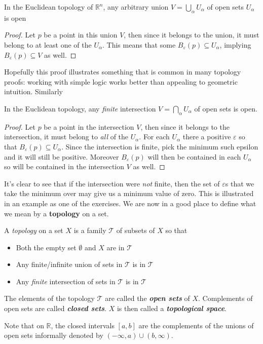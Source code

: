 	\begin{prop}
		In the Euclidean topology of $\mathbb{R}^n$, any arbitrary union $V = \bigcup_\alpha U_\alpha$ of open sets $U_\alpha$ is open 
	\end{prop}
	\begin{proof}
		Let $p$ be a point in this union $V$, then since it belongs to the union, it must belong to at least one of the $U_\alpha$. This means that some $B_\varepsilon(p) \subseteq U_\alpha$, implying $B_\varepsilon (p) \subseteq V$ as well.
	\end{proof}
	Hopefully this proof illustrates something that is common in many topology proofs: working with simple logic works better than appealing to geometric intuition. Similarly
	\begin{prop}
		In the Euclidean topology, any \emph{finite} intersection $V = \bigcap_\alpha U_\alpha$ of open sets is open.
	\end{prop}
	\begin{proof}
		Let $p$ be a point in the intersection $V$, then since it belongs to the intersection, it must belong to \emph{all} of the $U_\alpha$. For each $U_\alpha$ there a positive $\varepsilon$ so that $B_\varepsilon(p) \subseteq U_\alpha$. Since the intersection is finite, pick the minimum such epsilon and it will still be positive. Moreover $B_\varepsilon(p)$ will then be contained in each $U_\alpha$ so will be contained in the intersection $V$ as well.
	\end{proof}
	It's clear to see that if the intersection were \emph{not} finite, then the set of $\varepsilon$s that we take the minimum over may give us a minimum value of zero. This is illustrated in an example as one of the exercises. We are now in a good place to define what we mean by a \textbf{topology} on a set.
	
	\begin{defn}\label{def:Topology}
		A \emph{topology} on a set $X$ is a family $\mathcal T$ of subsets of $X$ so that
		\begin{itemize}
			\item Both the empty set $\emptyset$ and $X$ are in $\mathcal T$
			\item Any finite/infinite union of sets in $\mathcal T$ is in $\mathcal T$
			\item Any \emph{finite} intersection of sets in $\mathcal T$ is in $\mathcal T$
		\end{itemize}
		The elements of the topology $\mathcal T$ are called the \textbf{\emph{open sets}} of $X$. Complements of open sets are called \textbf{\emph{closed sets}}. $X$ is then called a \textbf{\emph{topological space}}.
	\end{defn}
	Note that on $\mathbb{R}$, the closed intervals $[a,b]$ are the complements of the unions of open sets informally denoted by $(-\infty, a) \cup (b, \infty)$.
	
